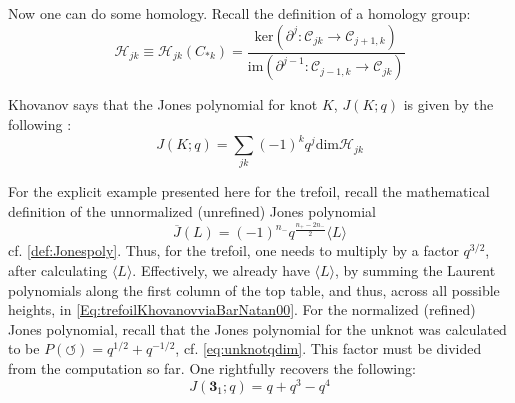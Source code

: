 \documentclass[a4paper,titlepage,twoside]{book}
\begin{document}

Now one can do some homology.  Recall the definition of a homology group:
\begin{equation}
\mathcal{H}_{jk} \equiv \mathcal{H}_{jk}{(C_{*k})} = \frac{ \text{ker}{ ( \partial^j: \mathcal{C}_{jk} \to \mathcal{C}_{j+1,k} ) } }{ \text{im}{ ( \partial^{j-1} : \mathcal{C}_{j-1,k} \to \mathcal{C}_{jk} )} }
\end{equation}

Khovanov says that the Jones polynomial for knot $K$, $J(K;q)$ is given by the following \cite{Khovanov2000}:
\begin{equation}
  J{ (K;q)} = \sum_{jk} (-1)^k q^j \text{dim}{ \mathcal{H}_{jk}}
\end{equation}

For the explicit example presented here for the trefoil, recall the mathematical definition of the unnormalized (unrefined) Jones polynomial 
\[
\overline{J}{ (L)} = (-1)^{n_-} q^{ \frac{ n_+ - 2n_- }{2} } \langle L \rangle
\]
cf. \eqref{def:Jonespoly}.  Thus, for the trefoil, one needs to multiply by a factor $q^{3/2}$, after calculating $\langle L \rangle$.  Effectively, we already have $\langle L \rangle$, by summing the Laurent polynomials along the first column of the top table, and thus, across all possible heights, in \eqref{Eq:trefoilKhovanovviaBarNatan00}.  For the normalized (refined) Jones polynomial, recall that the Jones polynomial for the unknot was calculated to be $P{ ( \circlearrowleft)} = q^{1/2} + q^{-1/2}$, cf. \eqref{eq:unknotqdim}. This factor must be divided from the computation so far.  One rightfully recovers the following:
\[
J{(\mathbf{3}_1;q)} = q + q^3 - q^4
\]


\end{document}
